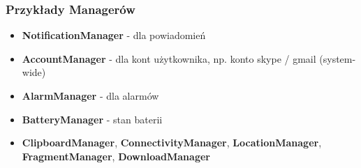 \begin{frame}\frametitle{Przykłady Managerów}
  \begin{itemize}
    \item \textbf{NotificationManager} - dla powiadomień\\
    \pause \item \textbf{AccountManager} - dla kont użytkownika, np. konto skype / gmail (system-wide)\\
    \pause \item \textbf{AlarmManager} - dla alarmów\\
    \pause \item \textbf{BatteryManager} - stan baterii\\
    \pause \item \textbf{ClipboardManager}, \textbf{ConnectivityManager}, \textbf{LocationManager},
                 \textbf{FragmentManager}, \textbf{DownloadManager}
  \end{itemize}
\end{frame}


